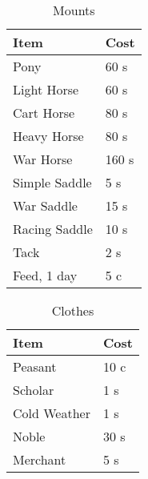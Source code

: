 \documentclass[a4paper,11pt,oneside]{book}
\begin{document}
\begin{table}[ht]
	\centering
	\caption{Mounts}
	\begin{tabular}{|l|l|}
		\hline
		Item & Cost\\ [0.5ex]
		\hline
		Pony & 60 s\\
		Light Horse & 60 s\\
		Cart Horse & 80 s\\
		Heavy Horse & 80 s\\
		War Horse & 160 s\\
		\hline
		Simple Saddle & 5 s\\
		War Saddle & 15 s\\
		Racing Saddle & 10 s\\
		Tack & 2 s\\
		Feed, 1 day & 5 c\\
		\hline
	\end{tabular}
\end{table}

\begin{table}[ht]
	\centering
	\caption{Clothes}
	\begin{tabular}{|l|l|}
		\hline
		Item & Cost\\ [0.5ex]
		\hline
		Peasant & 10 c\\
		Scholar & 1 s\\
		Cold Weather & 1 s\\
		Noble & 30 s\\
		Merchant & 5 s\\
		\hline
	\end{tabular}
\end{table}





\listoftables
\end{document}
